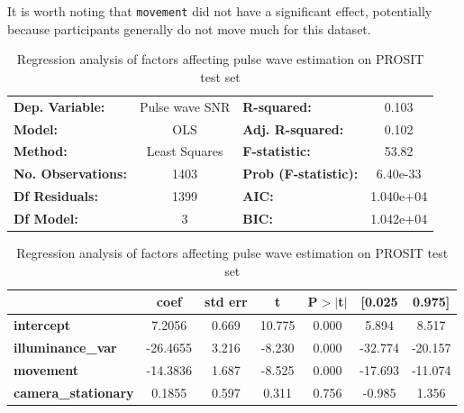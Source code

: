 \documentclass{article}
\begin{document}
It is worth noting that \texttt{movement} did not have a significant effect, potentially because participants generally do not move much for this dataset.

\begin{table}[h!]
\begin{center}
\caption{Regression analysis of factors affecting pulse wave estimation on PROSIT test set}
\label{tab:vv-hr-regression-prosit}
\begin{tabular}{lclc}
\toprule
\textbf{Dep. Variable:}          &  Pulse wave SNR  & \textbf{  R-squared:         } &     0.103   \\
\textbf{Model:}                  &       OLS        & \textbf{  Adj. R-squared:    } &     0.102   \\
\textbf{Method:}                 &  Least Squares   & \textbf{  F-statistic:       } &     53.82   \\
\textbf{No. Observations:}       &        1403      & \textbf{  Prob (F-statistic):} &  6.40e-33   \\
\textbf{Df Residuals:}           &        1399      & \textbf{  AIC:               } & 1.040e+04   \\
\textbf{Df Model:}               &           3      & \textbf{  BIC:               } & 1.042e+04   \\
\bottomrule
\end{tabular}
\begin{tabular}{lcccccc}
                                 & \textbf{coef} & \textbf{std err} & \textbf{t} & \textbf{P$> |$t$|$} & \textbf{[0.025} & \textbf{0.975]}  \\
\midrule
\textbf{intercept}               &       7.2056  &        0.669     &    10.775  &         0.000        &        5.894    &        8.517     \\
\textbf{illuminance\_var} 		 &     -26.4655  &        3.216     &    -8.230  &         0.000        &      -32.774    &      -20.157     \\
\textbf{movement}       			 &     -14.3836  &        1.687     &    -8.525  &         0.000        &      -17.693    &      -11.074     \\
\textbf{camera\_stationary}   	 &       0.1855  &        0.597     &     0.311  &         0.756        &       -0.985    &        1.356     \\
\bottomrule
\end{tabular}
\end{center}
\end{table}
\end{document}
